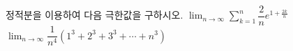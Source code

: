 정적분을 이용하여 다음 극한값을 구하시오.
 $\displaystyle\lim_{n\to\infty}\sum_{k=1}^{n}\dfrac{2}{n}e^{1+\frac{2k}{n}}$
 $\displaystyle\lim_{n\to\infty}\dfrac{1}{n^4}(1^3+2^3+3^3+\cdots+n^3)$
